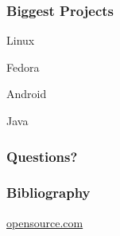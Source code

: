 \documentclass{beamer}
\begin{document}
\begin{frame}
  \frametitle{Biggest Projects}
  Linux

  Fedora

  Android

  Java
\end{frame}


\begin{frame}
  \frametitle{Questions?}
  
\end{frame}

\begin{frame}
  \frametitle{Bibliography}
  \begin{center}
    \Large
    \href{https://opensource.com/open-source-way}{opensource.com}
  \end{center}
\end{frame}
\end{document}
